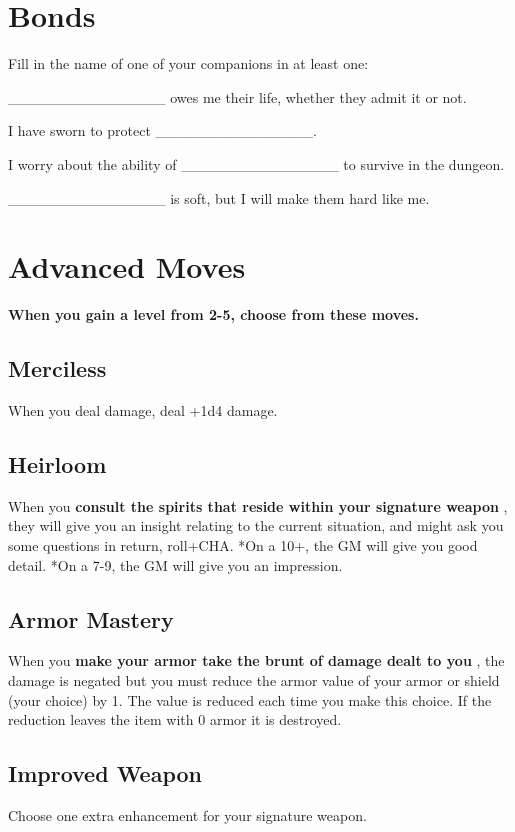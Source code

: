 \section*{Bonds}

Fill in the name of one of your companions in at least one:

\_\_\_\_\_\_\_\_\_\_\_\_\_\_\_ owes me their life, whether they admit it or not.

I have sworn to protect \_\_\_\_\_\_\_\_\_\_\_\_\_\_\_.

I worry about the ability of \_\_\_\_\_\_\_\_\_\_\_\_\_\_\_ to survive in the dungeon.

\_\_\_\_\_\_\_\_\_\_\_\_\_\_\_ is soft, but I will make them hard like me.
\section*{Advanced Moves}

{\bfseries When you gain a level from 2-5, choose from these moves.}
\subsection{Merciless}

When you deal damage, deal +1d4 damage.
\subsection{Heirloom}

When you \textbf{consult the spirits that reside within your signature weapon}
, they will give you an insight relating to the current situation, and might ask you some questions in return, roll+CHA. *On a 10+, the GM will give you good detail. *On a 7-9, the GM will give you an impression.
\subsection{Armor Mastery}

When you \textbf{make your armor take the brunt of damage dealt to you}
, the damage is negated but you must reduce the armor value of your armor or shield (your choice) by 1. The value is reduced each time you make this choice. If the reduction leaves the item with 0 armor it is destroyed.
\subsection{Improved Weapon}

Choose one extra enhancement for your signature weapon.
